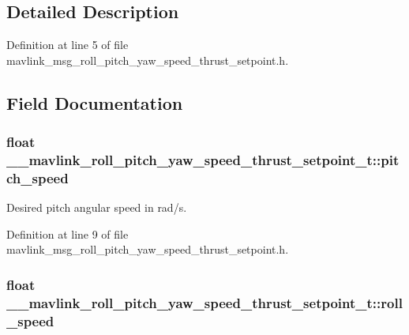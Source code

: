 \subsection{Detailed Description}


Definition at line 5 of file mavlink\-\_\-msg\-\_\-roll\-\_\-pitch\-\_\-yaw\-\_\-speed\-\_\-thrust\-\_\-setpoint.\-h.



\subsection{Field Documentation}
\hypertarget{struct____mavlink__roll__pitch__yaw__speed__thrust__setpoint__t_a5046534fc2b083023a74d5f4aaf36e33}{
\subsubsection[{pitch\-\_\-speed}]{\setlength{\rightskip}{0pt plus 5cm}float \-\_\-\-\_\-mavlink\-\_\-roll\-\_\-pitch\-\_\-yaw\-\_\-speed\-\_\-thrust\-\_\-setpoint\-\_\-t\-::pitch\-\_\-speed}}\label{struct____mavlink__roll__pitch__yaw__speed__thrust__setpoint__t_a5046534fc2b083023a74d5f4aaf36e33}


Desired pitch angular speed in rad/s. 



Definition at line 9 of file mavlink\-\_\-msg\-\_\-roll\-\_\-pitch\-\_\-yaw\-\_\-speed\-\_\-thrust\-\_\-setpoint.\-h.

\hypertarget{struct____mavlink__roll__pitch__yaw__speed__thrust__setpoint__t_a643f9a210dda52b34891163c9463185e}{
\subsubsection[{roll\-\_\-speed}]{\setlength{\rightskip}{0pt plus 5cm}float \-\_\-\-\_\-mavlink\-\_\-roll\-\_\-pitch\-\_\-yaw\-\_\-speed\-\_\-thrust\-\_\-setpoint\-\_\-t\-::roll\-\_\-speed}}\label{struct____mavlink__roll__pitch__yaw__speed__thrust__setpoint__t_a643f9a210dda52b34891163c9463185e}


